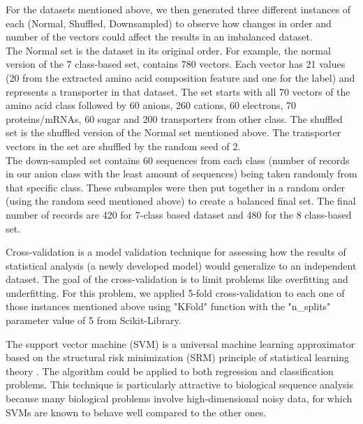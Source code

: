     For the datasets mentioned above, we then generated three different instances of each (Normal, Shuffled, Downsampled) 
    to observe how changes in order and number of the vectors could affect the results in an imbalanced dataset.\\
    
    The Normal set is the dataset in its original order. For example, the normal version of the 7 class-based set, 
    contains 780 vectors. Each vector has 21 values (20 from the extracted amino acid composition feature and one for the label) 
    and represents a transporter in that dataset. The set starts with all 70 vectors of the amino acid class 
    followed by 60 anions, 260 cations, 60 electrons, 70 proteins/mRNAs, 60 sugar and 200 transporters from other class. 
    The shuffled set is the shuffled version of the Normal set mentioned above. The transporter vectors in the set are 
    shuffled by the random seed of 2.\\

    The down-sampled set contains 60 sequences from each class (number of records in our anion class with 
    the least amount of sequences) being taken randomly from that specific class. These subsamples were then put together in 
    a random order (using the random seed mentioned above) to create a balanced final set. The final number of records 
    are 420 for 7-class based dataset and 480 for the 8 class-based set.\\

    

    Cross-validation is a model validation technique for assessing how the results of 
    statistical analysis (a newly developed model) would generalize to an independent dataset. 
    The goal of the cross-validation is to limit problems like overfitting and underfitting. 
    For this problem, we applied 5-fold cross-validation to each one of those instances mentioned above using 
    "KFold" function with the "n\_splits" parameter value of 5 from Scikit-Library.\\

   
    
    The support vector machine (SVM) is a universal machine learning approximator based on the structural risk minimization (SRM) 
    principle of statistical learning theory \cite{vapnik1995}. The algorithm could be applied to both regression and 
    classification problems. This technique is particularly attractive to biological sequence analysis because many biological 
    problems involve high-dimensional noisy data, for which SVMs are known to behave well 
    compared to the other ones.\cite{zavaljevski2002support}\\

